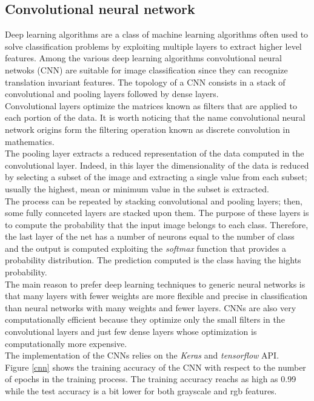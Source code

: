 \documentclass{article}
\begin{document}
\subsection{Convolutional neural network}
Deep learning algorithms are a class of machine learning algorithms often used to solve classification problems by exploiting multiple layers to extract higher level features. Among the various deep learning algorithms convolutional neural netwoks (CNN) are suitable for image classification since they can recognize translation invariant features. The topology of a  CNN consists in a stack of convolutional and pooling layers followed by dense layers. \\
Convolutional layers optimize the matrices known as filters that are applied to each portion of the data. It is worth noticing that the name convolutional neural network origins form the filtering operation known as discrete convolution in mathematics. \\ 
The pooling layer extracts a reduced representation of the data computed in the convolutional layer. Indeed, in this layer the dimensionality of the data is reduced by selecting a subset of the image and extracting a single value from each subset; usually the highest, mean or minimum value in the subset is extracted. \\
The process can be repeated by stacking convolutional and pooling layers; then, some fully connceted layers are stacked upon them. The purpose of these layers is to compute the probability that the input image belongs to each class. Therefore, the last layer of the net has a number of neurons equal to the number of class and the output is computed exploiting the \textit{softmax} function that provides a probability distribution. The prediction computed is the class having the hights probability. \\
The main reason to prefer deep learning techniques  to generic neural networks is that many layers with fewer weights are more flexible and precise in classification than neural networks with many weights and fewer layers. CNNs are also very computationally efficient because they optimize only the small filters in the convolutional layers and just few dense layers whose optimization is computationally more expensive. \\
The implementation of the CNNs relies on the \textit{Keras} and \textit{tensorflow} API.\\
Figure \ref{cnn} shows the training accuracy of the CNN with respect to the number of epochs in the training process. The training accuracy reachs as high as 0.99 while the test accuracy is a bit lower for both grayscale and rgb features.
\end{document}
